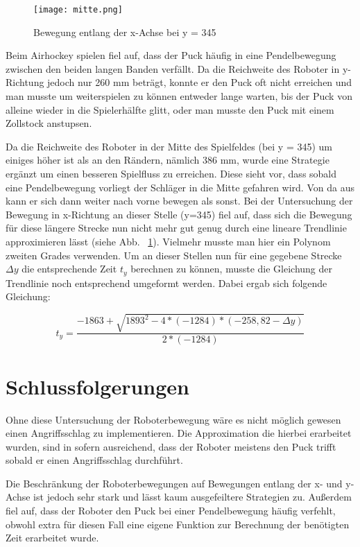 \begin{figure}[htbp]
\centering
\texttt{[image: mitte.png]}
\caption{Bewegung entlang der x-Achse bei y = 345} 
\label{mitte}
\end{figure}
  
Beim Airhockey spielen fiel auf, dass der Puck häufig in eine Pendelbewegung zwischen den beiden langen Banden verfällt. Da die Reichweite des Roboter in y-Richtung jedoch nur 260 mm beträgt, konnte er den Puck oft nicht erreichen und man musste um weiterspielen zu können entweder lange warten, bis der Puck von alleine wieder in die Spielerhälfte glitt, oder man musste den Puck mit einem Zollstock anstupsen. 

Da die Reichweite des Roboter in der Mitte des Spielfeldes (bei y = 345) um einiges höher ist als an den Rändern, nämlich 386 mm, wurde eine Strategie ergänzt um einen besseren Spielfluss zu erreichen. Diese sieht vor, dass sobald eine Pendelbewegung vorliegt der Schläger in die Mitte gefahren wird. Von da aus kann er sich dann weiter nach vorne bewegen als sonst. 
Bei der Untersuchung der Bewegung in x-Richtung an dieser Stelle (y=345) fiel auf, dass sich die Bewegung für diese längere Strecke nun nicht mehr gut genug durch eine lineare Trendlinie approximieren lässt (siehe Abb. ~\ref{mitte}). Vielmehr musste man hier ein Polynom zweiten Grades verwenden. Um an dieser Stellen nun für eine gegebene Strecke $ \Delta y $ die entsprechende Zeit $ t_y $ berechnen zu können, musste die Gleichung der Trendlinie noch entsprechend umgeformt werden. Dabei ergab sich folgende Gleichung:

\begin{equation}
t_y = \dfrac{-1863+\sqrt{1893^2-4*(-1284)*(-258,82-\Delta y)}}{2*(-1284)}
\end{equation} 

\section{Schlussfolgerungen}
\label{fazitbewegung}
Ohne diese Untersuchung der Roboterbewegung wäre es nicht möglich gewesen einen Angriffsschlag zu implementieren. Die Approximation die hierbei erarbeitet wurden, sind in sofern ausreichend, dass der Roboter meistens den Puck trifft sobald er einen Angriffsschlag durchführt. 

Die Beschränkung der Roboterbewegungen auf Bewegungen entlang der x- und y-Achse ist jedoch sehr stark und lässt kaum ausgefeiltere Strategien zu. Außerdem fiel auf, dass der Roboter den Puck bei einer Pendelbewegung häufig verfehlt, obwohl extra für diesen Fall eine eigene Funktion zur Berechnung der benötigten Zeit erarbeitet wurde. 

